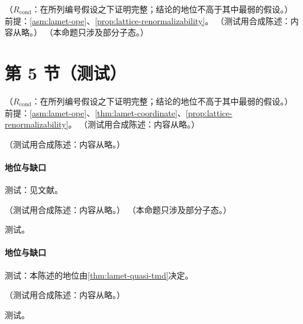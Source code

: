 \begin{theorem}\label{thm:lamet-coordinate}
（$R_{\mathrm{cond}}$：在所列编号假设之下证明完整；结论的地位不高于其中最弱的假设。）
前提：\cref{asm:lamet-ope}、\cref{prop:lattice-renormalizability}。
（测试用合成陈述：内容从略。）
（本命题只涉及部分子态。）
\end{theorem}

\section{第 5 节（测试）}\label{sec:lamet-renorm}

\begin{theorem}\label{thm:lamet-parton-momentum}
（$R_{\mathrm{cond}}$：在所列编号假设之下证明完整；结论的地位不高于其中最弱的假设。）
前提：\cref{asm:lamet-ope}、\cref{thm:lamet-coordinate}、\cref{prop:lattice-renormalizability}。
（测试用合成陈述：内容从略。）
\end{theorem}

\begin{remark}\label{rem:lamet-early-form}
（测试用合成陈述：内容从略。）
\end{remark}
\paragraph{地位与缺口}测试：见文献。

\begin{proposition}\label{prop:lamet-cfp}
（测试用合成陈述：内容从略。）
（本命题只涉及部分子态。）
\end{proposition}
\begin{proofsketch}测试。\end{proofsketch}
\paragraph{地位与缺口}测试：本陈述的地位由\cref{thm:lamet-quasi-tmd}决定。

\begin{theorem}\label{thm:lamet-lcs}
（测试用合成陈述：内容从略。）
\end{theorem}
\begin{proofsketch}测试。\end{proofsketch}
